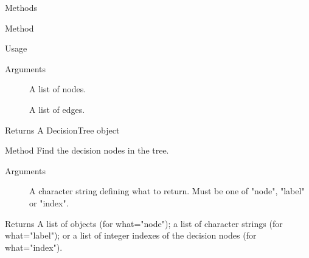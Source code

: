 \documentclass[a4paper]{book}
\begin{document}
\begin{Section}{Methods}
\begin{SubSection}{Method }
\begin{SubSubSection}{Usage}
\end{SubSubSection}


%
\begin{SubSubSection}{Arguments}

\begin{description}

\item[] A list of nodes.

\item[] A list of edges.

\end{description}


\end{SubSubSection}

%
\begin{SubSubSection}{Returns}
A DecisionTree object
\end{SubSubSection}

\end{SubSection}



\hypertarget{method-decision_nodes}{}
%
\begin{SubSection}{Method }
Find the decision nodes in the tree.
%


%
\begin{SubSubSection}{Arguments}

\begin{description}

\item[] A character string defining what to return. Must be one
of "node", "label" or "index".

\end{description}


\end{SubSubSection}

%
\begin{SubSubSection}{Returns}
A list of  objects (for what="node"); a list
of character strings (for what="label"); or a list of integer indexes of 
the decision nodes (for what="index").
\end{SubSubSection}

\end{SubSection}




\end{Section}
\end{document}
